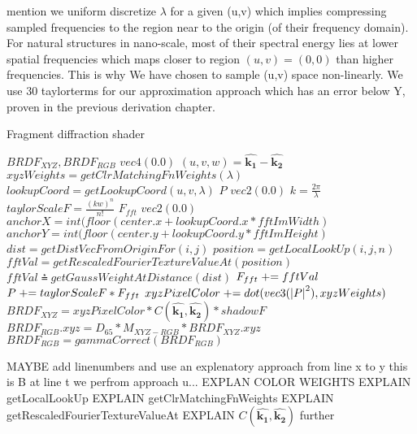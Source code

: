 mention we uniform discretize $\lambda$ for a given (u,v) which implies compressing sampled frequencies to the region near to the origin (of their frequency domain). 
For natural structures in nano-scale, most of their spectral energy lies at lower spatial frequencies which maps closer to region $(u,v) = (0,0)$ than higher frequencies. This is why We have chosen to sample (u,v) space non-linearly. We use 30 taylorterms for our approximation approach which has an error below Y, proven in the previous derivation chapter.

\begin{algorithm}
  \caption{Fragment diffraction shader}
  \begin{algorithmic}
      \State \init $BRDF_{XYZ}, BRDF_{RGB}$ \to $vec4(0.0)$
      \State $(u,v,w) = \hat{\mathbf{k_1}}-\hat{\mathbf{k_2}}$
        \State $xyzWeights = getClrMatchingFnWeights(\lambda)$
        \State $lookupCoord = getLookupCoord(u, v, \lambda)$
        \State \init $P$ \to $vec2(0.0)$
        \State $k = \frac{2\pi}{\lambda}$
          \State $taylorScaleF = \frac{(kw)^n}{n!}$
          \State \init $F_{fft}$  \to $vec2(0.0)$
          \State $anchorX = int(floor(center.x + lookupCoord.x * fftImWidth)$
          \State $anchorY = int(floor(center.y + lookupCoord.y * fftImHeight)$
              \State $dist = getDistVecFromOriginFor(i,j)$
              \State $position = getLocalLookUp(i,j,n)$
              \State $fftVal = getRescaledFourierTextureValueAt(position)$
              \State $fftVal \asteq getGaussWeightAtDistance(dist)$
              \State $F_{fft} \mathrel{+}= fftVal$
            \EndFor
          \EndFor
          \State $P \mathrel{+}= taylorScaleF*F_{fft}$
        \EndFor
        \State $xyzPixelColor \mathrel{+}= dot(vec3(\left|P\right|^2), xyzWeights)$
      \EndFor
      \State $BRDF_{XYZ} = xyzPixelColor*C(\hat{\mathbf{k_1}},\hat{\mathbf{k_2}})*shadowF$
      \State $BRDF_{RGB}.xyz = D_{65}*M_{XYZ-RGB}*BRDF_{XYZ}.xyz$
      \State $BRDF_{RGB}= gammaCorrect(BRDF_{RGB})$
    \EndFor
  \end{algorithmic}
\end{algorithm}

MAYBE add linenumbers and use an explenatory approach from line x to y this is B
at line t we perfrom approach u...
EXPLAN COLOR WEIGHTS
EXPLAIN getLocalLookUp
EXPLAIN getClrMatchingFnWeights
EXPLAIN getRescaledFourierTextureValueAt
EXPLAIN $C(\hat{\mathbf{k_1}},\hat{\mathbf{k_2}})$ further


